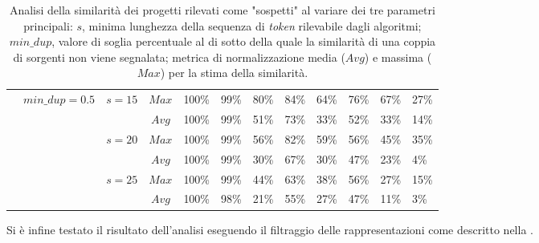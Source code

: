\begin{landscape}
\begin{table}[h!]
\begin{tabular}{ p{0.5cm}|c|c|c||p{1.2cm}|p{1.2cm}|p{1.2cm}|p{1.2cm}|p{1.2cm}|p{1.2cm}|p{1.2cm}|p{1.2cm} }
            & \multirow{6}{*}{$min\_dup=0.5$} & \multirow{2}{*}{$s=15$} & $Max$ & 100\% & 99\% & 80\% & 84\% & 64\% & 76\% & 67\% & 27\% \\
            & & & $Avg$ & 100\% & 99\% & 51\% & 73\% & 33\% & 52\% & 33\% & 14\% \\
            & & \multirow{2}{*}{$s=20$} & $Max$ & 100\% & 99\% & 56\% & 82\% & 59\% & 56\% & 45\% & 35\% \\
            & & & $Avg$ & 100\% & 99\% & 30\% & 67\% & 30\% & 47\% & 23\% & 4\% \\
            & & \multirow{2}{*}{$s=25$} & $Max$ & 100\% & 99\% & 44\% & 63\% & 38\% & 56\% & 27\% & 15\% \\
            & & & $Avg$ & 100\% & 98\% & 21\% & 55\% & 27\% & 47\% & 11\% & 3\% \\
            \hline
        \end{tabular}
        \caption[Analisi della similarità dei progetti rilevati come "sospetti" al variare dei parametri]{Analisi della similarità dei progetti rilevati come "sospetti" al variare dei tre parametri principali: $s$, minima lunghezza della sequenza di \textit{token} rilevabile dagli algoritmi; $min\_dup$, valore di soglia percentuale al di sotto della quale la similarità di una coppia di sorgenti non viene segnalata; metrica di normalizzazione media ($Avg$) e massima ($Max$) per la stima della similarità.}
        \label{table:grid-search}
    \end{table}
\end{landscape}

Si è infine testato il risultato dell'analisi eseguendo il filtraggio delle rappresentazioni come descritto nella .

